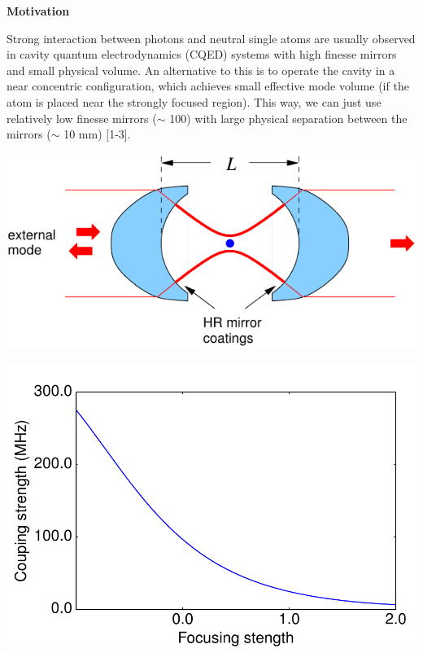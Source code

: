\documentclass[portrait,a0,final]{a0poster} %
\makeatletter
\newenvironment{figurehere}
  {\def\@captype{figure}}
  {}
\newenvironment{poster}{
  \begin{center}
  \begin{minipage}[c]{0.98\textwidth}
}{
  \end{minipage} 
  \end{center}
}
\makeatother
\begin{document}
\begin{poster}
\vspace{0.2cm}



\vspace{1cm}
\begin{multicols}{2}
\setlength{\parskip}{1ex plus 0.5ex minus 0.2ex}

      \begin{center}
          \begin{center}{\bf \Large \textsf {Motivation}}\end{center}
      \end{center}

 Strong interaction between photons and neutral single atoms are usually observed in cavity quantum electrodynamics (CQED) systems with high finesse mirrors and small physical volume. An alternative to this is to operate the cavity in a near concentric configuration, which achieves small effective mode volume (if the atom is placed near the strongly focused region). This way, we can just use relatively low finesse mirrors ($\sim$ 100) with large physical separation between the mirrors ($\sim$ 10 mm) [1-3].

\begin{figurehere}

    \begin{multicols}{2}
        \begin{center}
            \includegraphics[width=\columnwidth]{cavitything}

            \includegraphics[width=\columnwidth]{coupling_strength.pdf}


\end{center}
\end{multicols}
\end{figurehere}
\end{multicols}
\end{poster}
\end{document}
